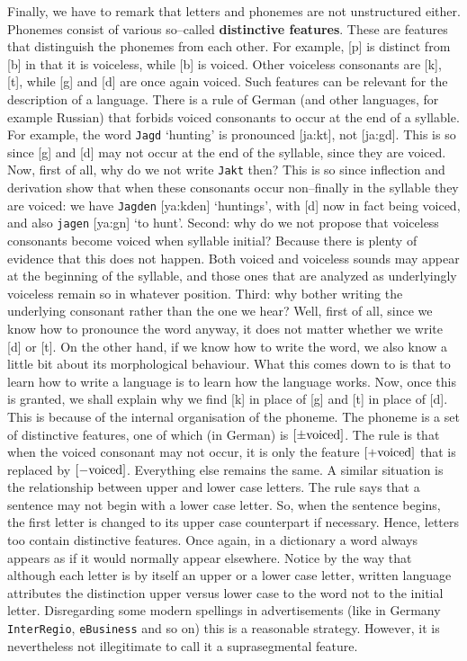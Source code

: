 Finally, we have to remark that letters and phonemes are not
unstructured either. Phonemes consist of various so--called
\textbf{distinctive features}. These are features that distinguish
the pho\-ne\-mes from each other. For example, [p] is distinct from
[b] in that it is voiceless, while [b] is voiced. Other voiceless
consonants are [k], [t], while [g] and [d] are once again voiced.
Such features can be relevant for the description of a language.
There is a rule of German (and other languages, for example
Russian) that forbids voiced consonants to occur at the end of a
syllable. For example, the word {\tt Jagd} `hunting' is pronounced
[\textprimstress ja:kt], not [\textprimstress ja:gd]. This is so 
since [g] and [d] may not occur at the end of the syllable, since 
they are voiced. Now, first of all, why do we not write {\tt Jakt} 
then? This is so since inflection and derivation show that when these 
consonants occur non--finally in the syllable they are voiced: we 
have {\tt Jagden} [\textprimstress ya:kden] `huntings', with [d] 
now in fact being voiced, and also {\tt jagen} 
[\textprimstress ya:g\textschwa n] `to hunt'. Second: why
do we not propose that voiceless consonants become voiced when
syllable initial? Because there is plenty of evidence that this
does not happen. Both voiced and voiceless sounds may appear at
the beginning of the syllable, and those ones that are analyzed as
underlyingly voiceless remain so in whatever position. Third: why
bother writing the underlying consonant rather than the one we
hear? Well, first of all, since we know how to pronounce the word
anyway, it does not matter whether we write [d] or [t]. On the
other hand, if we know how to write the word, we also know a
little bit about its morphological behaviour. What this comes down
to is that to learn how to write a language is to learn how the
language works. Now, once this is granted, we shall explain why we
find [k] in place of [g] and [t] in place of [d]. This is because
of the internal organisation of the phoneme. The phoneme is a set
of distinctive features, one of which (in German) is $[\pm
\mbox{\rm voiced}]$. The rule is that when the voiced consonant
may not occur, it is only the feature $[+ \mbox{\rm voiced}]$ that
is replaced by $[- \mbox{\rm voiced}]$. Everything else remains
the same. A similar situation is the relationship between upper
and lower case letters. The rule says that a sentence may not
begin with a lower case letter. So, when the sentence begins, the
first letter is changed to its upper case counterpart if
necessary. Hence, letters too contain distinctive features. Once
again, in a dictionary a word always appears as if it would normally 
appear elsewhere. Notice by the way that although each letter is by 
itself an upper or a lower case letter, written
language attributes the distinction upper versus lower case to the
word not to the initial letter.  Disregarding some modern
spellings in advertisements (like in Germany {\tt InterRegio},
{\tt eBusiness} and so on) this is a reasonable strategy. However,
it is nevertheless not illegitimate to call it a suprasegmental
feature.

